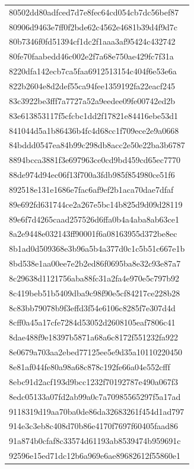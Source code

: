 \begin{tabular}{l}
80502dd80adfced7d7e8fec64cd054cb7dc56bef87 \\
80906d9463e7ff0f2bde62c4562e4681b39d4f9d7c \\
80b7346f0fd51394cf1dc2f1aaa3af95424c432742 \\
80fe70faabedd46c002e2f7a68e750ae429fc7f31a \\
8220dfa142ecb7ca5faa6912513154c404f6e53e6a \\
822b2604e8d2def55ca94fee1359192fa22eacf245 \\
83c3922be3fff7a7727a52a9eedee09fe00742ed2b \\
83e613853117f5cfcbc1dd2f17821e84416ebe53d1 \\
841044d5a1b86436b4fc4d68cc1f709ece2e9a0668 \\
84bddd0547ea84b99c298db8acc2e50e22ba3b6787 \\
8894bcca3881f3e697963ce0cd9bd459cd65ec7770 \\
88de974d94ec06f13f700a3fdb985f854980ce51f6 \\
892518e131e1686e7fac6af9ef2b1aca70dae7dfaf \\
89e692fd631744ce2a267e5bc14b825d9d09d28119 \\
89e6f7d4265caad257526d6ffa0b4a4aba8ab63ce1 \\
8a2e9448e032143ff90001f6a08163955d372be8ec \\
8b1ad0d509368e3b96a5b4a377d0c1c5b51c667e1b \\
8bd538e1aa00ee7e2b2ed86f0695ba8e32c93e87a7 \\
8c29638d1121756aba88fc31a2fa4e970e5c797b92 \\
8c419beb51b5409dba9c98f90e5cf84217ce228b28 \\
8c83bb79078b9f3effd3f54e6106c8285f7e307d4d \\
8cff0a45a17cfe7284d53052d2608105eaf7806c41 \\
8dae488f9e18397b5871a68a6c8172f551232fa922 \\
8e0679a703aa2ebed77125ee5e9d35a10110220450 \\
8e81af044fe80a98a68c878c192fe66a04e552cfff \\
8ebc91d2acf193d9bcc1232f70192787e490a067f3 \\
8edc05133a07fd2ab99a0c7a70985565297f5a17ad \\
9118319d19aa70ba0de86da32683261f454d1ad797 \\
914e3c3eb8c408d70b86e4170f7697f60405faad86 \\
91a874b0cfaf8c33574d61193ab8539474b959691c \\
92596e15ed71dc12b6a969e6ae89682612f55860e1 \\

\end{tabular}
